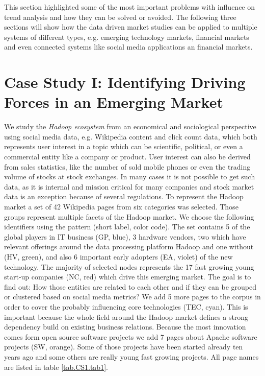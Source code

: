 \documentclass[a4paper,10pt]{scrbook}
\begin{document}
This section highlighted some of the most important problems with influence on trend analysis and how they can be solved or avoided. The following three sections will show how the data driven market studies can be applied to multiple systems of different types, e.g. emerging technology markets, financial markets and even connected systems like social media applications an financial markets. 

%

\section{Case Study I: Identifying Driving Forces in an Emerging Market}
We study the \textit{Hadoop ecosystem} from an economical and sociological perspective using social media data, e.g. Wikipedia content and click count data, which both represents user interest in a topic which can be scientific, political, or even a commercial entity like a company or product. User interest can also be derived from sales statistics, like the number of sold mobile phones or even the trading volume of stocks at stock exchanges. In many cases it is not possible to get such data, as it is internal and mission critical for many companies and stock market data is an exception because of several regulations.
To represent the Hadoop market a set of 42 Wikipedia pages from six categories was selected. Those groups represent multiple facets of the Hadoop market. We choose the following identifiers using the pattern (short label, color code). The set contains 5 of the global players in IT business (GP, blue), 3 hardware vendors, two which have relevant offerings around the data processing platform Hadoop and one without (HV, green), and also 6 important early adopters (EA, violet) of the new technology. The majority of selected nodes represents the 17 fast growing young start-up companies (NC, red) which drive this emerging market. The goal is to find out: How those entities are related to each other and if they can be grouped or clustered based on social media metrics? We add 5 more pages to the corpus in order to cover the probably influencing core technologies (TEC, cyan). This is important because the whole field around the Hadoop market defines a strong dependency build on existing business relations. Because the most innovation comes form open source software projects we add 7 pages about Apache software projects (SW, orange). Some of those projects have been started already ten years ago and some others are really young fast growing projects. All page names are listed in table  \ref{tab.CS1.tab1}. 
\end{document}
